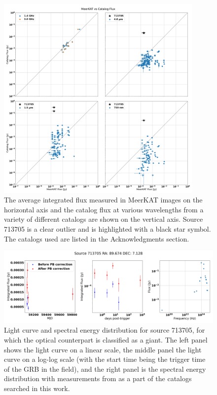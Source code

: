 \documentclass[12pt]{article}
\begin{document}
\begin{figure}
	\includegraphics[width=0.9\textwidth]{combinedfluxfluxplots.png}
	\caption{The average integrated flux measured in MeerKAT images on the horizontal axis and the catalog flux at various wavelengths from a variety of different catalogs are shown on the vertical axis. Source 713705 is a clear outlier and is highlighted with a black star symbol. The catalogs used are listed in the Acknowledgments section.}
	\label{fig:combinedfluxfluxplots}
\end{figure}

\begin{figure}
	\includegraphics[width=\textwidth]{src713705lc4.png}
	\caption{Light curve and spectral energy distribution for source 713705, for which the optical counterpart is classified as a giant. The left panel shows the light curve on a linear scale, the middle panel the light curve on a log-log scale (with the start time being the trigger time of the GRB in the field), and the right panel is the spectral energy distribution with measurements from \citet{2003yCat.2246....0C,2012wise.rept....1C,2022yCat.1355....0G} as a part of the catalogs searched in this work.}
	\label{fig:src713705lc4.png}
\end{figure}
\end{document}
